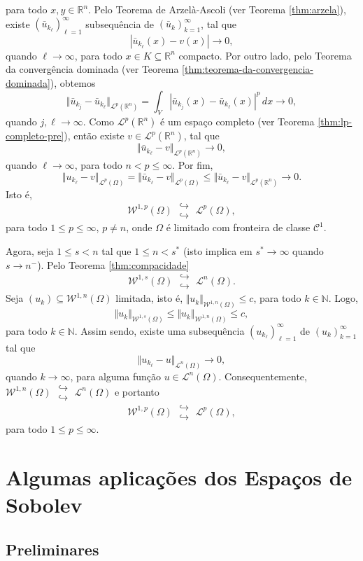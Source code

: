 \documentclass[a4paper, 11pt]{book}
\theoremstyle{definition}
\newcommand{\bN}{\mathbb{N}}
\newcommand{\bR}{\mathbb{R}}
\newcommand{\cC}{\mathcal{C}}
\newcommand{\cL}{\mathcal{L}}
\newcommand{\cW}{\mathcal{W}}
\newcommand{\doublehookrightarrow}{\;\substack{\hookrightarrow \\ \hookrightarrow}\;}
\begin{document}
para todo $x,y \in \bR^n$.
Pelo Teorema de Arzelà-Ascoli (ver Teorema \ref{thm:arzela}), existe $(\bar u_{k_\ell})_{\ell=1}^\infty$ subsequência de $(\bar u_k)_{k=1}^\infty$, tal que
\[
    |\bar u_{k_\ell}(x) - v(x)| \to 0,
\]
quando $\ell \to \infty$, para todo $x \in K \subseteq \bR^n$ compacto.
Por outro lado, pelo Teorema da convergência dominada (ver Teorema \ref{thm:teorema-da-convergencia-dominada}), obtemos
\[
    \Vert \bar u_{k_j} - \bar u_{k_\ell} \Vert_{\cL^p(\bR^n)} = \int_{V} |\bar u_{k_j}(x) - \bar u_{k_\ell}(x)|^p \,dx \to 0,
\]
quando $j,\ell \to \infty$.
Como $\cL^p(\bR^n)$ é um espaço completo (ver Teorema \ref{thm:lp-completo-pre}), então existe $v \in \cL^p(\bR^n)$, tal que
\[
    \Vert \bar u_{k_\ell} - v \Vert_{\cL^p(\bR^n)} \to 0,
\]
quando $\ell \to \infty$, para todo $n < p \leqslant \infty$.
Por fim,
\[
    \Vert u_{k_\ell} - v \Vert_{\cL^p(\Omega)} = \Vert \bar u_{k_\ell} - v \Vert_{\cL^p(\Omega)} \leqslant \Vert \bar u_{k_\ell} - v \Vert_{\cL^p(\bR^n)} \to 0.
\]
Isto é,
\[
    \cW^{1,p}(\Omega) \doublehookrightarrow \cL^p(\Omega),
\]
para todo $1 \leqslant p \leqslant \infty$, $p \neq n$, onde $\Omega$ é limitado com fronteira de classe $\cC^1$.

Agora, seja $1 \leqslant s < n$ tal que $1 \leqslant n < s^*$ (isto implica em $s^* \to \infty$ quando $s \to n^-$).
Pelo Teorema \ref{thm:compacidade}
\[
    \cW^{1,s}(\Omega) \doublehookrightarrow \cL^n(\Omega).
\]
Seja $(u_k) \subseteq \cW^{1,n}(\Omega)$ limitada, isto é, $\Vert u_k \Vert_{\cW^{1,n}(\Omega)} \leqslant c$, para todo $k \in \bN$.
Logo,
\[
    \Vert u_k \Vert_{\cW^{1,s}(\Omega)} \leqslant \Vert u_k \Vert_{\cW^{1,n}(\Omega)} \leqslant c,
\]
para todo $k \in \bN$.
Assim sendo, existe uma subsequência $(u_{k_\ell})_{\ell=1}^\infty$ de $(u_k)_{k=1}^\infty$ tal que
\[
    \Vert u_{k_\ell} - u \Vert_{\cL^n(\Omega)} \to 0,
\]
quando $k \to \infty$, para alguma função $u \in \cL^n(\Omega)$.
Consequentemente, $\cW^{1,n}(\Omega) \doublehookrightarrow \cL^n(\Omega)$ e portanto
\[
    \cW^{1,p}(\Omega) \doublehookrightarrow \cL^p(\Omega),
\]
para todo $1 \leqslant p \leqslant \infty$.

\chapter{Algumas aplicações dos Espaços de Sobolev}

\section{Preliminares}
\end{document}
